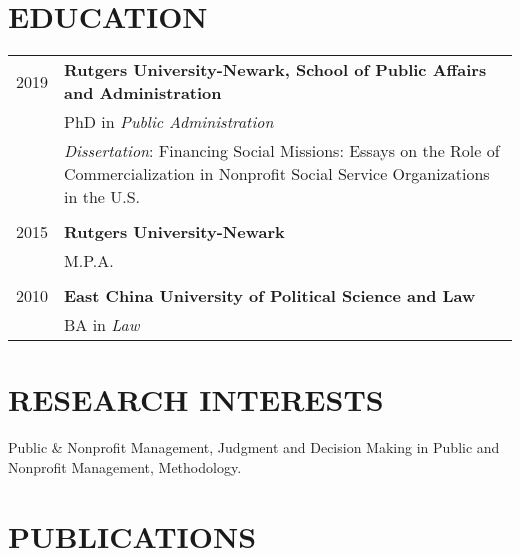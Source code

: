 \documentclass[letterpaper]{article}
\renewenvironment{itemize}{
  \begin{list}{}{
    \setlength{\leftmargin}{1.5em}
  }
}{
  \end{list}
}
\begin{document}
\bigskip

\section*{EDUCATION}

\begin{tabular}{ p{2.5cm} p{13cm} }
   2019 & \textbf{Rutgers University-Newark, School of Public Affairs and Administration} \\
   & PhD in \it{Public Administration} \\
   &{\it Dissertation}: Financing Social Missions: Essays on the Role of Commercialization in Nonprofit Social Service Organizations in the U.S.\\
   &\\
   2015 & \textbf{Rutgers University-Newark} \\
   &M.P.A.\\
   & \\
   2010 & \textbf{East China University of Political Science and Law} \\
   &BA in \it{Law}

\end{tabular}


\bigskip

\section*{RESEARCH INTERESTS}
\begin{itemize}
\item Public \& Nonprofit Management, Judgment and Decision Making in Public and Nonprofit Management, Methodology.
\end{itemize}

\bigskip



\section*{PUBLICATIONS}
\end{document}
